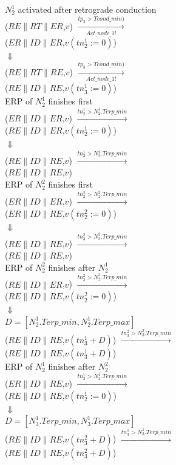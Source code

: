 $N_2^1$ activated after retrograde conduction\\
($RE\| RT\| ER$,$v$) 
$\xrightarrow[Act\_node\_1!]{tp_2>Tcond\_min)}$ \\
($ER\| ID\| ER$,$v(tn_2^1:=0)$)\\
$\Downarrow$\\
($RE\| RT\| RE$,$v$) 
$\xrightarrow[Act\_node\_1!]{tp_3>Tcond\_min)}$ \\
($RE\| ID\| RE$,$v(tn_3^1:=0)$)\\

ERP of $N_2^1$ finishes first\\
($ER\| ID\| ER$,$v$) 
$\xrightarrow{tn_2^1>N_2^1.Terp\_min}$ \\
($RE\| ID\| ER$,$v(tn_2^1:=0)$)\\
$\Downarrow$\\
($RE\| ID\| RE$,$v$) 
$\xrightarrow{tn_3^1>N_3^1.Terp\_min}$ \\
($RE\| ID\| RE$,$v$)\\

ERP of $N_2^2$ finishes first\\
($ER\| ID\| ER$,$v$) 
$\xrightarrow{tn_2^2>N_2^2.Terp\_min}$ \\
($ER\| ID\| RE$,$v(tn_2^2:=0)$)\\
$\Downarrow$\\
($RE\| ID\| RE$,$v$) 
$\xrightarrow{tn_3^2>N_3^2.Terp\_min}$ \\
($RE\| ID\| RE$,$v$)\\

ERP of $N_2^2$ finishes after $N_2^1$\\
($RE\| ID\| ER$,$v$) 
$\xrightarrow{tn_2^2>N_2^2.Terp\_min}$ \\
($RE\| ID\| RE$,$v(tn_2^2:=0)$)\\
$\Downarrow$\\
$D=[N_2^1.Terp\_min,N_2^1.Terp\_max]$\\
($RE\| ID\| RE$,$v(tn_3^1+D)$)
$\xrightarrow{tn_3^2>N_3^2.Terp\_min}$ \\
($RE\| ID\| RE$,$v(tn_3^1+D)$)\\

ERP of $N_2^1$ finishes after $N_2^2$\\
($ER\| ID\| RE$,$v$) 
$\xrightarrow{tn_2^1>N_2^1.Terp\_min}$ \\
($RE\| ID\| RE$,$v(tn_2^1:=0)$)\\
$\Downarrow$\\
$D=[N_3^1.Terp\_min,N_3^1.Terp\_max]$\\
($RE\| ID\| RE$,$v(tn_3^2+D)$) 
$\xrightarrow{tn_3^1>N_3^1.Terp\_min}$ \\
($RE\| ID\| RE$,$v(tn_3^2+D)$)\\


